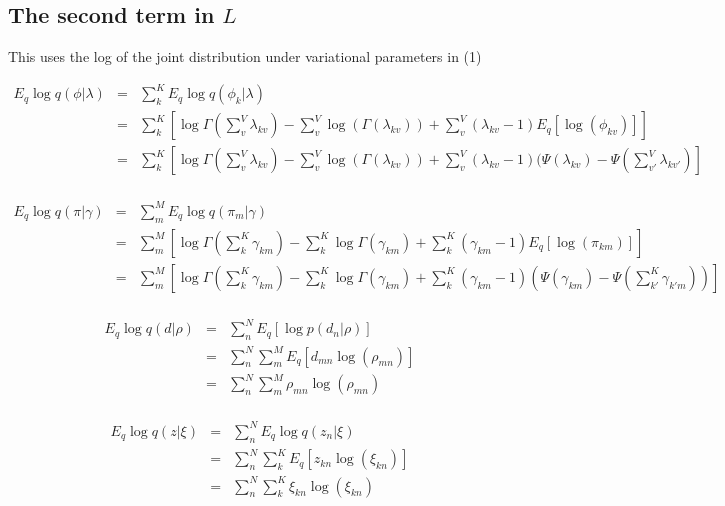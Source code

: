 \documentclass[]{article}
\newcommand{\mbrack}[1]{\left\lbrack #1 \right\rbrack}
\newcommand{\mparen}[1]{\left(#1\right)}
\begin{document}
\subsection*{The second term in $L$}

This uses the log of the joint distribution under variational parameters in (1)

\begin{eqnarray}
E_q \log q(\phi | \lambda) 
&=& \sum\limits_{k}^{K} E_q \log q(\phi_k | \lambda) \\
&=& \sum\limits_{k}^{K} \mbrack{\log \Gamma(\sum\limits_{v}^{V} \lambda_{kv}) - \sum\limits_{v}^{V} \log(\Gamma(\lambda_{kv})) + \sum\limits_{v}^{V}(\lambda_{kv}-1) E_q[\log(\phi_{kv})]} \\
&=& \sum\limits_{k}^{K} \left\lbrack \log \Gamma \mparen{\sum\limits_{v}^{V} \lambda_{kv}} - \sum\limits_{v}^{V} \log(\Gamma(\lambda_{kv})) + \sum\limits_{v}^{V}(\lambda_{kv}-1)(\Psi(\lambda_{kv}) - \Psi(\sum\limits_{v'}^{V} \lambda_{kv'}) \right\rbrack \\
\end{eqnarray}

\begin{eqnarray}
E_q \log q(\pi | \gamma) 
&=& \sum\limits_{m}^{M} E_q \log q(\pi_m | \gamma) \\
&=& \sum\limits_{m}^{M} \mbrack{ \log \Gamma \mparen{ \sum\limits_{k}^{K} \gamma_{km}} - \sum\limits_{k}^{K} \log \Gamma(\gamma_{km}) + \sum\limits_{k}^{K}(\gamma_{km}-1)E_q[\log(\pi_{km})] } \\
&=& \sum\limits_{m}^{M} \mbrack{ \log \Gamma\mparen{ \sum\limits_{k}^{K} \gamma_{km}} - \sum\limits_{k}^{K} \log \Gamma(\gamma_{km}) + \sum\limits_{k}^{K}(\gamma_{km}-1)(\Psi(\gamma_{km}) - \Psi(\sum\limits_{k'}^{K} \gamma_{k'm})) }\\
\end{eqnarray}

\begin{eqnarray}
E_q \log q(d | \rho) 
&=& \sum\limits_{n}^{N} E_q [\log p(d_n | \rho)] \\
&=& \sum\limits_{n}^{N} \sum\limits_{m}^{M} E_q [d_{mn} \log(\rho_{mn})] \\
&=& \sum\limits_{n}^{N} \sum\limits_{m}^{M} \rho_{mn} \log(\rho_{mn}) \\
\end{eqnarray}

\begin{eqnarray}
E_q \log q(z | \xi) 
&=& \sum\limits_{n}^{N} E_q \log q(z_n | \xi) \\
&=& \sum\limits_{n}^{N} \sum\limits_{k}^{K} E_q [z_{kn} \log(\xi_{kn})] \\
&=& \sum\limits_{n}^{N} \sum\limits_{k}^{K} \xi_{kn} \log(\xi_{kn})\\
\end{eqnarray}
\end{document}
